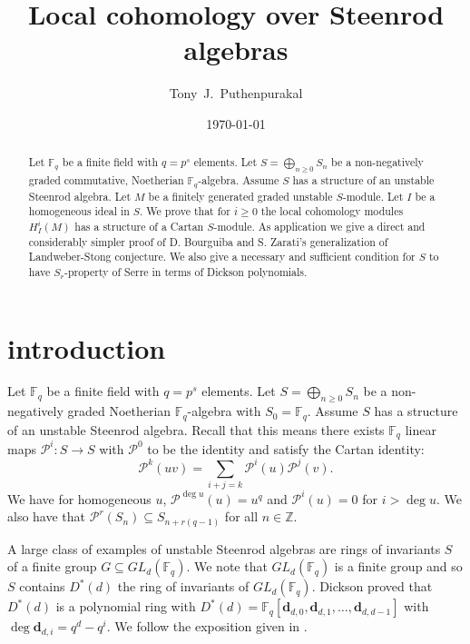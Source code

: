 \documentclass{amsart}
\newcommand{\F}{\mathbb{F} }
\newcommand{\Z}{\mathbb{Z} }
\newcommand{\Pc}{\mathcal{P} }
\newcommand{\db}{\mathbf{d} }
\newcommand{\rt}{\rightarrow}
\theoremstyle{plain}
\theoremstyle{definition}
\theoremstyle{remark}
\begin{document}
\title[Steenrod algebras]{Local cohomology over Steenrod algebras}
\author{Tony~J.~Puthenpurakal}
\date{\today}
\address{Department of Mathematics, Indian Institute of Technology Bombay, Powai, Mumbai 400 076, India}


 \begin{abstract}
Let $\F_q$ be a finite field with $q = p^s$ elements. Let $S = \bigoplus_{n \geq 0} S_n$ be a non-negatively  graded commutative,  Noetherian $\F_q$-algebra. Assume $S$ has a structure of an unstable Steenrod algebra. Let $M$ be a finitely generated graded unstable $S$-module. Let $I$ be a homogeneous ideal in $S$. We prove that for $i \geq 0$ the local cohomology modules $H^i_I(M)$ has a structure of a Cartan $S$-module. As application we give a direct and  considerably simpler proof of D. Bourguiba and S. Zarati's generalization of Landweber-Stong conjecture. We also give a necessary and sufficient condition for $S$ to have $S_r$-property of Serre in terms of Dickson  polynomials.
\end{abstract}
 \maketitle
\section{introduction}
Let $\F_q$ be a finite field with $q = p^s$ elements. Let $S = \bigoplus_{n \geq 0} S_n$ be a non-negatively  graded  Noetherian $\F_q$-algebra with $S_0 = \F_q$. Assume $S$ has a structure of an unstable Steenrod algebra. Recall that this means there exists $\F_q$ linear maps $\Pc^i \colon S \rt S$ with $\Pc^0$ to be the identity and satisfy the Cartan identity:
$$\Pc^k(uv) = \sum_{i+j = k}\Pc^i(u)\Pc^j(v). $$
We  have for homogeneous $u$, $\Pc^{\deg u}(u) = u^q$ and $\Pc^{i}(u) =  0$ for $i > \deg u$.
We also have that $\Pc^r(S_n) \subseteq S_{n + r(q-1)}$ for all $n \in \Z$.

A large class of examples of unstable Steenrod algebras are rings of invariants $S$ of a finite group $G \subseteq GL_d(\F_q)$.  We note that $GL_d(\F_q)$ is a finite group  and so $S$ contains $D^*(d)$ the ring of invariants of $GL_d(\F_q)$. Dickson proved that $D^*(d)$ is a polynomial ring with
$D^*(d) = \F_q[ \db_{d,0}, \db_{d, 1}, \ldots, \db_{d, d-1}]$ with $\deg \db_{d,i} = q^d - q^i$. We follow the exposition given in \cite{SL}.
\end{document}
